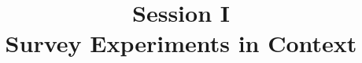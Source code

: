 

\title{Session I\\Survey Experiments in Context}

\date[]{}



\frame{\titlepage}

\frame{\tableofcontents}



